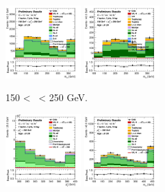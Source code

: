 \begin{figure}[h!]
\begin{subfigure}[b]{\textwidth}
        \includegraphics[width=0.32\textwidth]{Images/VH/Own_fit/postfit_VHcc/Region_distmBB_BMax250_BMin150_DCRHigh_J2_TTypelt_T2_L1_Y6051_GlobalFit_conditionnal_mu1.png}
        \includegraphics[width=0.32\textwidth]{Images/VH/Own_fit/postfit_VHcc/Region_distmBB_BMax250_BMin150_DCRHigh_J2_TTypett_T2_L1_Y6051_GlobalFit_conditionnal_mu1.png}
        \caption{150 < \ptv\ < 250 GeV.}
        \label{fig:plots_VHcc_1L_150_CRH_2J}
    \end{subfigure}
    \begin{subfigure}[b]{\textwidth}
        \centering
        \includegraphics[width=0.32\textwidth]{Images/VH/Own_fit/postfit_VHcc/Region_distpTV_BMin250_DCRHigh_J2_TTypent_T1_L1_Y6051_GlobalFit_conditionnal_mu1.png}
        \includegraphics[width=0.32\textwidth]{Images/VH/Own_fit/postfit_VHcc/Region_distmBB_BMin250_DCRHigh_J2_TTypelt_T2_L1_Y6051_GlobalFit_conditionnal_mu1.png}

\end{subfigure}
\end{figure}
